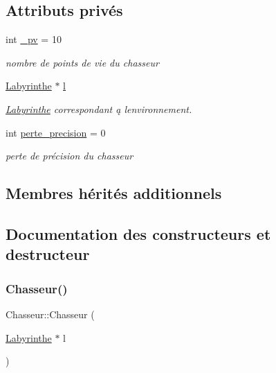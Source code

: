 \subsection*{Attributs privés}
\begin{DoxyCompactItemize}
\item 
int \hyperlink{classChasseur_a3c8f5b959145976c4d110a5a583791ab}{\+\_\+pv} = 10
\begin{DoxyCompactList}\small\item\em nombre de points de vie du chasseur \end{DoxyCompactList}\item 
\hyperlink{classLabyrinthe}{Labyrinthe} $\ast$ \hyperlink{classChasseur_a96372f6800e28733746f01393aa47ff6}{l}
\begin{DoxyCompactList}\small\item\em \hyperlink{classLabyrinthe}{Labyrinthe} correspondant ą l\textquotesingle{}environnement. \end{DoxyCompactList}\item 
int \hyperlink{classChasseur_af49bab4221ac24439c87bbda4cc9293d}{perte\+\_\+precision} = 0
\begin{DoxyCompactList}\small\item\em perte de précision du chasseur \end{DoxyCompactList}\end{DoxyCompactItemize}
\subsection*{Membres hérités additionnels}


\subsection{Documentation des constructeurs et destructeur}
\mbox{\label{classChasseur_a1901991ecabfb707b82334f56b277560}} 
\subsubsection{\texorpdfstring{Chasseur()}{Chasseur()}}
{\footnotesize\ttfamily Chasseur\+::\+Chasseur (\begin{DoxyParamCaption}\item[{\hyperlink{classLabyrinthe}{Labyrinthe} $\ast$}]{l }\end{DoxyParamCaption})}



